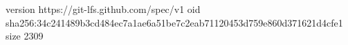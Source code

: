 version https://git-lfs.github.com/spec/v1
oid sha256:34c241489b3cd484ec7a1ae6a51be7c2eab71120453d759e860d371621d4cfe1
size 2309
